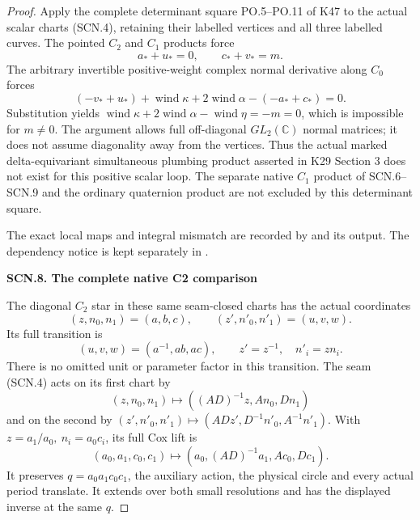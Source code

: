 \begin{proof}
\par\nobreak

Apply the complete determinant square PO.5--PO.11
of K47 to the actual scalar charts (SCN.4), retaining
their labelled vertices and all three labelled curves.
The pointed \(C_2\) and \(C_1\) products force
\[
                 a_*+u_*=0,\qquad c_*+v_*=m.
\]
The arbitrary invertible positive-weight complex
normal derivative along \(C_0\) forces
\[
      (-v_*+u_*)+\operatorname{wind}\kappa
            +2\operatorname{wind}\alpha-(-a_*+c_*)=0.
\]
Substitution yields
\(\operatorname{wind}\kappa+2\operatorname{wind}\alpha
 -\operatorname{wind}\eta=-m=0\), which is impossible
for \(m\ne0\). The argument allows full off-diagonal
\(GL_2(\mathbb C)\) normal matrices; it does not assume
diagonality away from the vertices. Thus the actual
marked delta-equivariant simultaneous plumbing product
asserted in K29 Section 3 does not exist for this
positive scalar loop. The separate native \(C_1\)
product of SCN.6--SCN.9 and the ordinary quaternion
product are not excluded by this determinant square.

The exact local maps and integral mismatch are recorded
by  and its output.
The dependency notice is kept separately in
.

\par

\medskip\noindent\textbf{SCN.8. The complete native C2 comparison}

\par\nobreak

The diagonal \(C_2\) star in these same seam-closed
charts has the actual coordinates
\[
        (z,n_0,n_1)=(a,b,c),\qquad
        (z',n'_0,n'_1)=(u,v,w).
\]
Its full transition is
\[
       (u,v,w)=(a^{-1},ab,ac),\qquad
                 z'=z^{-1},\quad n'_i=zn_i.           \tag{SCN.22}
\]
There is no omitted unit or parameter factor in this
transition. The seam (SCN.4) acts on its first chart by
\[
       (z,n_0,n_1)\longmapsto
                    ((AD)^{-1}z,An_0,Dn_1)
\]
and on the second by
\((z',n'_0,n'_1)\mapsto(ADz',D^{-1}n'_0,A^{-1}n'_1)\).
With \(z=a_1/a_0,\ n_i=a_0c_i\), its full Cox lift is
\[
   (a_0,a_1,c_0,c_1)\longmapsto
                (a_0,(AD)^{-1}a_1,Ac_0,Dc_1).        \tag{SCN.23}
\]
It preserves \(q=a_0a_1c_0c_1\), the auxiliary action,
the physical circle and every actual period translate.
It extends over both small resolutions and has the
displayed inverse at the same \(q\).


\end{proof}

